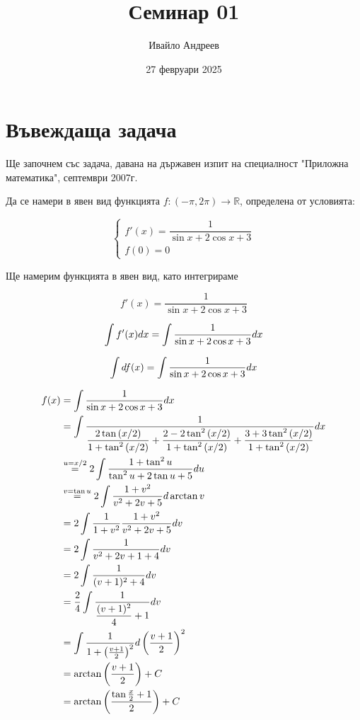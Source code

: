 \documentclass{scrartcl}
\title{Семинар 01}
\author{Ивайло Андреев}
\date{27 февруари 2025}
\begin{document}
\maketitle  %

\section{Въвеждаща задача}

\begin{FlushLeft}
Ще започнем със задача, давана на държавен изпит на специалност "Приложна математика", септември 2007г.
\end{FlushLeft}

\begin{FlushLeft}
Да се намери в явен вид функцията $f:(-\pi, 2\pi)\rightarrow\mathbb{R}$, определена от условията:
\end{FlushLeft}

$$
\begin{cases}
f'(x) = \dfrac{1}{\sin{x}+2\cos{x}+3}
\\
f(0) = 0
\end{cases}
$$

\begin{FlushLeft}
Ще намерим функцията в явен вид, като интегрираме
\end{FlushLeft}

$$f'(x) = \dfrac{1}{\sin{x}+2\cos{x}+3}$$

$$\displaystyle \int f'(x)\space dx = \int \dfrac{1}{\sin{x}+2\cos{x}+3} \space dx$$

$$\displaystyle \int \space df(x) = \int \dfrac{1}{\sin{x}+2\cos{x}+3} \space dx$$

\begin{align*}
\displaystyle f(x)
&= \int \dfrac{1}{\sin{x}+2\cos{x}+3} \space dx\\
&= \int \dfrac{1}{\dfrac{2\tan{(x/2)}}{1+\tan^2{(x/2)}}+\dfrac{2-2\tan^2{(x/2)}}{1+\tan^2{(x/2)}}+\dfrac{3+3\tan^2{(x/2)}}{1+\tan^2{(x/2)}}} \space dx\\
&\overset{u = x/2}{=} 2\int \dfrac{1+\tan^2{u}}{\tan^2{u}+2\tan{u}+5} \space du\\
&\overset{v=\tan{u}}{=} 2\int \dfrac{1+v^2}{v^2+2v+5} \space d\arctan{v}\\
&= 2\int \dfrac{1}{1+v^2}\dfrac{1+v^2}{v^2+2v+5} \space dv\\
&= 2\int \dfrac{1}{v^2+2v+1+4} \space dv\\
&= 2\int \dfrac{1}{(v+1)^2+4} \space dv\\
&= \dfrac{2}{4}\int \dfrac{1}{\dfrac{(v+1)^2}{4}+1} \space dv\\
&= \int \dfrac{1}{1+\left(\frac{v+1}{2}\right)^2} \space d\left(\frac{v+1}{2}\right)^2\\
&= \arctan{\left(\dfrac{v+1}{2}\right)} + C\\
&= \arctan{\left(\dfrac{\tan{\frac{x}{2}}+1}{2}\right)} + C
\end{align*}
\end{document}
